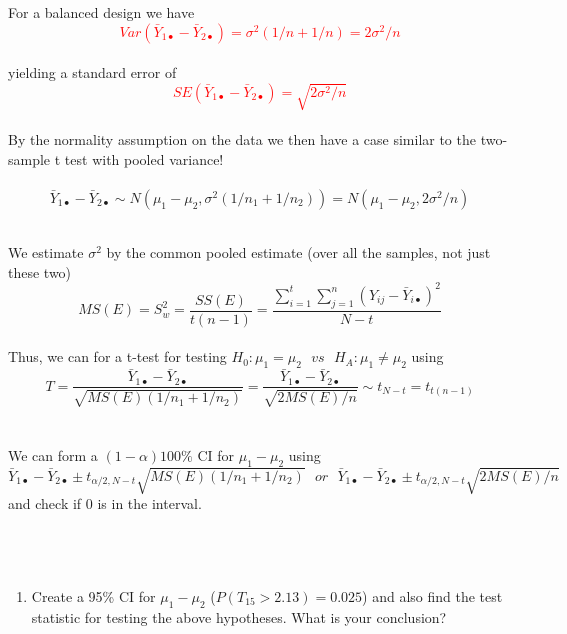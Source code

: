 For a balanced design we have%
\textcolor{red}{$$Var(\bar{Y}_{1\bullet}-\bar{Y}_{2\bullet}) = \sigma^2(1/n+1/n) = 2\sigma^2/n$$}~\\
yielding a standard error of%
\textcolor{red}{$$SE(\bar{Y}_{1\bullet}-\bar{Y}_{2\bullet})=\sqrt{2\sigma^2/n}$$}~\\

By the normality assumption on the data we then have a case similar to the two-sample t test with pooled variance!\\~\\
$$\bar{Y}_{1\bullet}-\bar{Y}_{2\bullet}\sim N(\mu_1-\mu_2,\sigma^2(1/n_1+1/n_2)) = N(\mu_1-\mu_2,2\sigma^2/n) $$~\\

\newpage

We estimate $\sigma^2$ by the common pooled estimate (over all the samples, not just these two)
$$MS(E)=S^2_w=\frac{SS(E)}{t(n-1)}=\frac{\sum_{i=1}^{t}\sum_{j=1}^{n}(Y_{ij}-\bar{Y}_{i\bullet})^2}{N-t}$$~\\

Thus, we can for a t-test for testing $H_0:\mu_1=\mu_2~~~vs~~~H_A:\mu_1\neq\mu_2$ using
$$T=\frac{\bar{Y}_{1\bullet}-\bar{Y}_{2\bullet}}{\sqrt{MS(E)(1/n_1+1/n_2)}}=\frac{\bar{Y}_{1\bullet}-\bar{Y}_{2\bullet}}{\sqrt{2MS(E)/n}}\sim t_{N-t}=t_{t(n-1)}$$~\\~\\
We can form a $(1-\alpha)100\%$ CI for $\mu_1-\mu_2$ using
$$\bar{Y}_{1\bullet}-\bar{Y}_{2\bullet}\pm t_{\alpha/2,N-t}\sqrt{MS(E)(1/n_1+1/n_2)}~~~or~~~\bar{Y}_{1\bullet}-\bar{Y}_{2\bullet}\pm t_{\alpha/2,N-t}\sqrt{2MS(E)/n}$$
and check if 0 is in the interval.\\~\\~\\~\\
\begin{enumerate}
\item Create a 95\% CI for $\mu_1-\mu_2$ ($P(T_{15}>2.13)=0.025$) and also find the test statistic for testing the above hypotheses.   What is your conclusion?
\end{enumerate}

